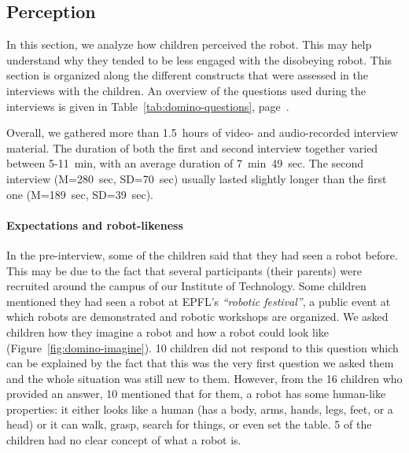 \documentclass{sig-alternate}
\begin{document}
\subsection{Perception}

In this section, we analyze how children perceived the robot. This may help
understand why they tended to be less engaged with the disobeying robot. This
section is organized along the different constructs that were assessed in the
interviews with the children. An overview of the questions used during the
interviews is given in Table~\ref{tab:domino-questions},
page~\pageref{tab:domino-questions}.

Overall, we gathered more than 1.5~hours of video- and audio-recorded interview
material. The duration of both the first and second interview together varied
between 5-11~min, with an average duration of 7~min~49~sec. The second interview
(M=280~sec, SD=70~sec) usually lasted slightly longer than the first one
(M=189~sec, SD=39~sec).


\paragraph{Expectations and robot-likeness}

In the pre-interview, some of the children said that they had seen a robot
before. This may be due to the fact that several participants (their parents)
were recruited around the campus of our Institute of Technology. Some children
mentioned they had seen a robot at EPFL's \textit{``robotic festival''}, a
public event at which robots are demonstrated and robotic workshops are
organized. We asked children how they imagine a robot and how a robot could look
like (Figure~\ref{fig:domino-imagine}). 10 children did not respond to this
question which can be explained by the fact that this was the very first
question we asked them and the whole situation was still new to them. However,
from the 16 children who provided an answer, 10 mentioned that for them, a robot
has some human-like properties: it either looks like a human (has a body, arms,
hands, legs, feet, or a head) or it can walk, grasp, search for things, or even
set the table. 5 of the children had no clear concept of what a robot is.
	
\end{document}
